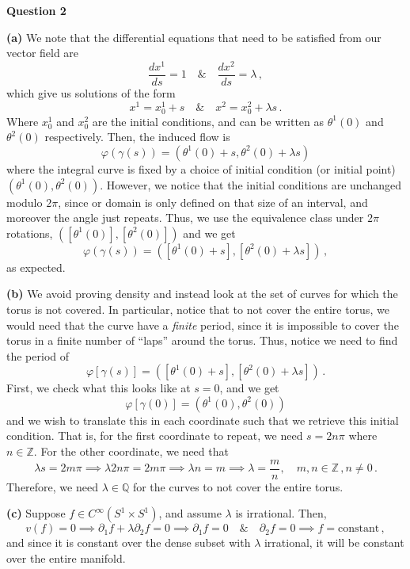 \documentclass[10pt]{article}
\newcommand{\Z}{\mathbb{Z}}
\newcommand{\Q}{\mathbb{Q}}
\begin{document}
\newpage
\textbf{Question 2}

\textbf{(a)} We note that the differential equations that need to be satisfied from our vector field are
\[ \frac{dx^{1}}{ds} = 1 \quad \& \quad \frac{dx^{2}}{ds} = \lambda \, ,\]
which give us solutions of the form
\[ x^{1} = x^{1}_{0} + s \quad \& \quad x^{2} = x^{2}_{0} + \lambda s \, .\]
Where $x^{1}_{0}$ and $x^{2}_{0}$ are the initial conditions, and can be written as $\theta^{1}(0)$ and $\theta^{2}(0)$ respectively. Then, the induced flow is
\[ \varphi(\gamma(s)) = \left(\theta^{1}(0) + s, \theta^{2}(0) + \lambda s\right) \]
where the integral curve is fixed by a choice of initial condition (or initial point) $(\theta^{1}(0),\theta^{2}(0))$. However, we notice that the initial conditions are unchanged modulo $2\pi$, since or domain is only defined on that size of an interval, and moreover the angle just repeats. Thus, we use the equivalence class under $2\pi$ rotations, $([\theta^{1}(0)],[\theta^{2}(0)])$ and we get
\[ \varphi(\gamma(s)) = ([\theta^{1}(0) + s], [\theta^{2}(0) + \lambda s]) \, ,\]
as expected.

\textbf{(b)} We avoid proving density and instead look at the set of curves for which the torus is not covered. In particular, notice that to not cover the entire torus, we would need that the curve have a \textit{finite} period, since it is impossible to cover the torus in a finite number of ``laps'' around the torus. Thus, notice we need to find the period of
\[ \varphi[\gamma(s)] = ([\theta^{1}(0) + s],[\theta^{2}(0) + \lambda s]) \, .\]
First, we check what this looks like at $s=0$, and we get
\[ \varphi[\gamma(0)] = (\theta^{1}(0), \theta^{2}(0)) \]
and we wish to translate this in each coordinate such that we retrieve this initial condition. That is, for the first coordinate to repeat, we need $s = 2n\pi$ where $n\in \Z$. For the other coordinate, we need that
\[ \lambda s = 2m \pi \implies \lambda 2n\pi = 2m\pi \implies \lambda n = m \implies \lambda = \frac{m}{n}, \quad m,n \in \Z\,, n\neq 0 \, . \]
Therefore, we need $\lambda \in \Q$ for the curves to not cover the entire torus. 

\textbf{(c)} Suppose $f \in C^{\infty}(S^{1}\times S^{1})$, and assume $\lambda$ is irrational. Then,
\[v(f) = 0 \implies \partial_{1}f + \lambda \partial_{2}f = 0 \implies \partial_{1}f = 0 \quad \& \quad \partial_{2}f = 0 \implies f = \text{constant}\, , \]
and since it is constant over the dense subset with $\lambda$ irrational, it will be constant over the entire manifold.
\end{document}
